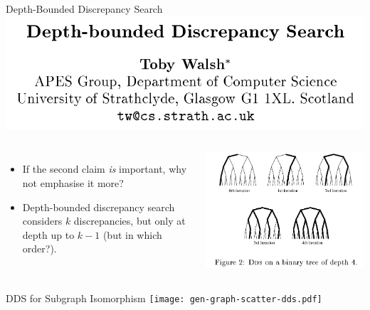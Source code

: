 \documentclass{beamer}
\begin{document}
\begin{frame}{Depth-Bounded Discrepancy Search}
    \centering\includegraphics[keepaspectratio=true,scale=0.2]{dds-paper.png}
    \vspace{1em}

    \begin{columns}[T]
        \begin{itemize}
            \item If the second claim \emph{is} important, why not emphasise it more?

            \item Depth-bounded discrepancy search considers $k$ discrepancies, but only at depth up
                to $k - 1$ (but in which order?).
        \end{itemize}
        \centering\includegraphics[keepaspectratio=true,scale=0.2]{dds-tree.png}
    \end{columns}
\end{frame}

\begin{frame}{DDS for Subgraph Isomorphism}
    \texttt{[image: gen-graph-scatter-dds.pdf]}
\end{frame}
\end{document}
